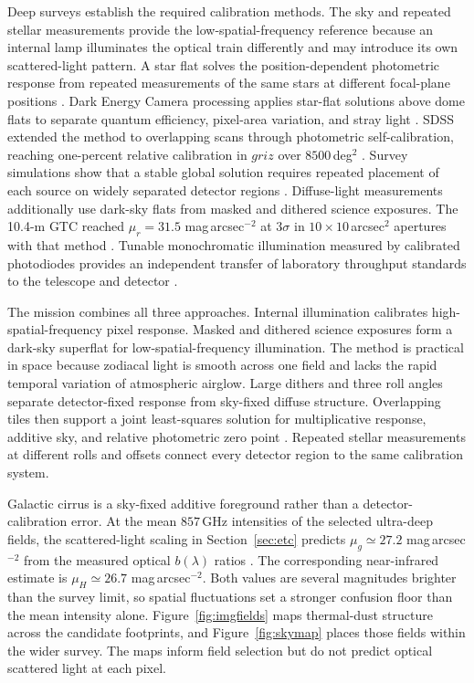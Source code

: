 Deep surveys establish the required calibration methods. The sky and repeated stellar measurements provide the low-spatial-frequency reference because an internal lamp illuminates the optical train differently and may introduce its own scattered-light pattern. A star flat solves the position-dependent photometric response from repeated measurements of the same stars at different focal-plane positions \cite{manfroid1996}. Dark Energy Camera processing applies star-flat solutions above dome flats to separate quantum efficiency, pixel-area variation, and stray light \cite{bernstein2017pasp}. SDSS extended the method to overlapping scans through photometric self-calibration, reaching one-percent relative calibration in $griz$ over $8500$\,deg$^2$ \cite{padmanabhan2008}. Survey simulations show that a stable global solution requires repeated placement of each source on widely separated detector regions \cite{holmes2012}. Diffuse-light measurements additionally use dark-sky flats from masked and dithered science exposures. The 10.4-m GTC reached $\mu_r=31.5$ mag\,arcsec$^{-2}$ at $3\sigma$ in $10\times10$\,arcsec$^2$ apertures with that method \cite{trujillofliri2016}. Tunable monochromatic illumination measured by calibrated photodiodes provides an independent transfer of laboratory throughput standards to the telescope and detector \cite{stubbs2006}.

The mission combines all three approaches. Internal illumination calibrates high-spatial-frequency pixel response. Masked and dithered science exposures form a dark-sky superflat for low-spatial-frequency illumination. The method is practical in space because zodiacal light is smooth across one field and lacks the rapid temporal variation of atmospheric airglow. Large dithers and three roll angles separate detector-fixed response from sky-fixed diffuse structure. Overlapping tiles then support a joint least-squares solution for multiplicative response, additive sky, and relative photometric zero point \cite{padmanabhan2008}. Repeated stellar measurements at different rolls and offsets connect every detector region to the same calibration system.

Galactic cirrus is a sky-fixed additive foreground rather than a detector-calibration error. At the mean $857$\,GHz intensities of the selected ultra-deep fields, the scattered-light scaling in Section~\ref{sec:etc} predicts $\mu_g\simeq27.2$ mag\,arcsec$^{-2}$ from the measured optical $b(\lambda)$ ratios \cite{ienaka2013}. The corresponding near-infrared estimate is $\mu_H\simeq26.7$ mag\,arcsec$^{-2}$. Both values are several magnitudes brighter than the survey limit, so spatial fluctuations set a stronger confusion floor than the mean intensity alone. Figure~\ref{fig:imgfields} maps thermal-dust structure across the candidate footprints, and Figure~\ref{fig:skymap} places those fields within the wider survey. The maps inform field selection but do not predict optical scattered light at each pixel.

